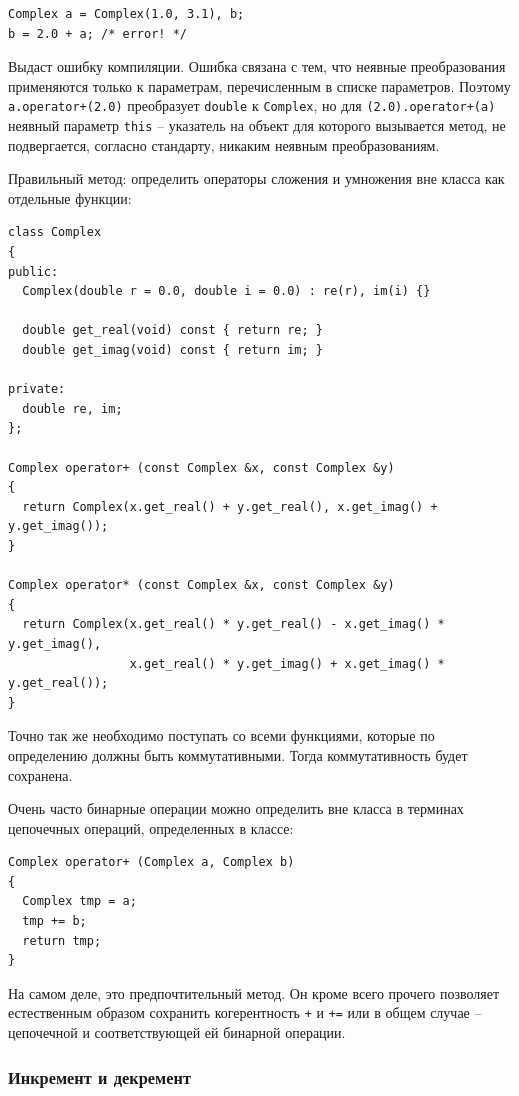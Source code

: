 \documentclass[a4paper,12pt,oneside]{article}
\begin{document}
\begin{lstlisting}
Complex a = Complex(1.0, 3.1), b;
b = 2.0 + a; /* error! */
\end{lstlisting}

Выдаст ошибку компиляции. Ошибка связана с тем, что неявные преобразования применяются только к параметрам, перечисленным в списке параметров. Поэтому \lstinline!a.operator+(2.0)! преобразует \lstinline!double! к \lstinline!Complex!, но для \lstinline!(2.0).operator+(a)! неявный параметр \lstinline!this! -- указатель на объект для которого вызывается метод, не подвергается, согласно стандарту, никаким неявным преобразованиям.

Правильный метод: определить операторы сложения и умножения вне класса как отдельные функции:

\begin{lstlisting}
class Complex
{
public:
  Complex(double r = 0.0, double i = 0.0) : re(r), im(i) {}

  double get_real(void) const { return re; }
  double get_imag(void) const { return im; }

private:
  double re, im;  
};

Complex operator+ (const Complex &x, const Complex &y) 
{ 
  return Complex(x.get_real() + y.get_real(), x.get_imag() + y.get_imag()); 
}

Complex operator* (const Complex &x, const Complex &y) 
{ 
  return Complex(x.get_real() * y.get_real() - x.get_imag() * y.get_imag(), 
                 x.get_real() * y.get_imag() + x.get_imag() * y.get_real()); 
}
\end{lstlisting}

Точно так же необходимо поступать со всеми функциями, которые по определению должны быть коммутативными. Тогда коммутативность будет сохранена.

Очень часто бинарные операции можно определить вне класса в терминах цепочечных операций, определенных в классе:

\begin{lstlisting}
Complex operator+ (Complex a, Complex b)
{
  Complex tmp = a;
  tmp += b;
  return tmp;
}
\end{lstlisting}

На самом деле, это предпочтительный метод. Он кроме всего прочего позволяет естественным образом сохранить когерентность \lstinline!+! и \lstinline!+=! или в общем случае -- цепочечной и соответствующей ей бинарной операции.

\subsubsection{Инкремент и декремент}\label{IncrOverload}
\end{document}
